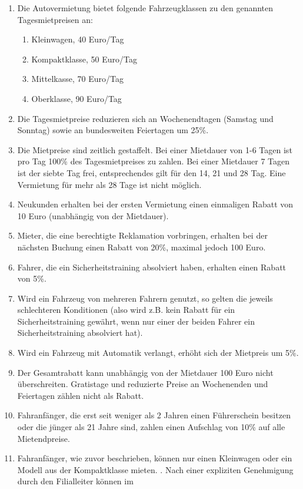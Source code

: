 \begin{enumerate}
	\item Die Autovermietung bietet folgende Fahrzeugklassen zu den genannten Tagesmietpreisen an:
	\begin{enumerate}
		\item Kleinwagen, 40 Euro/Tag
		\item Kompaktklasse, 50 Euro/Tag
		\item Mittelkasse, 70 Euro/Tag
		\item Oberklasse, 90 Euro/Tag
	\end{enumerate}
	\item Die Tagesmietpreise reduzieren sich an Wochenendtagen (Samstag und Sonntag) sowie an
	bundesweiten Feiertagen um 25\%.
	\item Die Mietpreise sind zeitlich gestaffelt. Bei einer Mietdauer von 1-6 Tagen ist pro Tag 100\% des
	Tagesmietpreises zu zahlen. Bei einer Mietdauer 7 Tagen ist der siebte Tag frei, entsprechendes
	gilt für den 14, 21 und 28 Tag. Eine Vermietung für mehr als 28 Tage ist nicht möglich.
	\item Neukunden erhalten bei der ersten Vermietung einen einmaligen Rabatt von 10 Euro
	(unabhängig von der Mietdauer).
	\item Mieter, die eine berechtigte Reklamation vorbringen, erhalten bei der nächsten Buchung einen
	Rabatt von 20\%, maximal jedoch 100 Euro.
	\item Fahrer, die ein Sicherheitstraining absolviert haben, erhalten einen Rabatt von 5\%.
	\item Wird ein Fahrzeug von mehreren Fahrern genutzt, so gelten die jeweils schlechteren Konditionen
	(also wird z.B. kein Rabatt für ein Sicherheitstraining gewährt, wenn nur einer der beiden Fahrer
	ein Sicherheitstraining absolviert hat).
	\item Wird ein Fahrzeug mit Automatik verlangt, erhöht sich der Mietpreis um 5\%.
	\item Der Gesamtrabatt kann unabhängig von der Mietdauer 100 Euro nicht überschreiten. Gratistage
	und reduzierte Preise an Wochenenden und Feiertagen zählen nicht als Rabatt.
	\item Fahranfänger, die erst seit weniger als 2 Jahren einen Führerschein besitzen oder die jünger als
	21 Jahre sind, zahlen einen Aufschlag von 10\% auf alle Mietendpreise.
	\item Fahranfänger, wie zuvor beschrieben, können nur einen Kleinwagen oder ein Modell aus der
	Kompaktklasse mieten. . Nach einer expliziten Genehmigung durch den Filialleiter können im

\end{enumerate}
